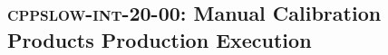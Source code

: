 \subsection{\textsc{cppslow-int-20-00}: Manual Calibration Products Production Execution}
\label{cppslow-int-20-00}
